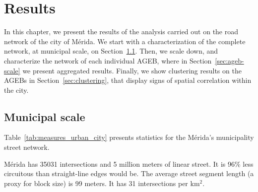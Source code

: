\chapter{Results}
\label{cha:chapter4}

In this chapter, we present the results of the analysis carried out on the road network of the city of Mérida. We start with a characterization of the complete network, at municipal scale, on Section~\ref{sec:municipal-scale}. Then, we scale down, and characterize the network of each individual AGEB, where in Section~\ref{sec:ageb-scale} we present aggregated results. Finally, we show clustering results on the AGEBs in Section~\ref{sec:clustering}, that display signs of spatial correlation within the city.

\section{Municipal scale}
\label{sec:municipal-scale}

Table~\ref{tab:measures_urban_city} presents statistics for the Mérida's municipality street network.

Mérida has 35031 intersections and 5 million meters of linear street.
It is 96\% less circuitous than straight-line edges would be. The average street segment length (a proxy for block size) is 99 meters. It has 31 intersections per km$^2$.


